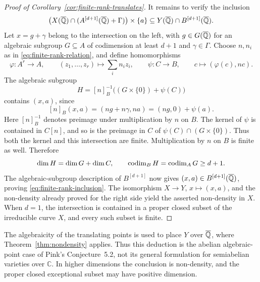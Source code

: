 \begin{proof}[Proof of Corollary~\ref{cor:finite-rank-translates}]
It remains to verify the inclusion
\begin{equation}\label{eq:finite-rank-inclusion}
 \bigl(X(\overline{\mathbb Q})\cap(A^{[d+1]}(\overline{\mathbb Q})+\Gamma)\bigr)\times\{a\}
 \subseteq Y(\overline{\mathbb Q})\cap B^{[d+1]}(\overline{\mathbb Q}).
\end{equation}
Let $x=g+\gamma$ belong to the intersection on the left, with
$g\in G(\overline{\mathbb Q})$ for an algebraic subgroup $G\subseteq A$ of codimension
at least $d+1$ and $\gamma\in\Gamma$. Choose $n,n_i$ as in
\eqref{eq:finite-rank-relation}, and define homomorphisms
\[
 \varphi:A^r\longrightarrow A,\qquad
 (z_1,\ldots,z_r)\longmapsto\sum_i n_i z_i,
 \qquad
 \psi:C\longrightarrow B,\qquad
 c\longmapsto(\varphi(c),nc).
\]
The algebraic subgroup
\[
 H=[n]_B^{-1}\bigl((G\times\{0\})+\psi(C)\bigr)
\]
contains $(x,a)$, since
\[
 [n]_B(x,a)=(ng+n\gamma,na)=(ng,0)+\psi(a).
\]
Here $[n]_B^{-1}$ denotes preimage under multiplication by $n$ on $B$.
The kernel of $\psi$ is contained in $C[n]$, and so is the preimage in
$C$ of $\psi(C)\cap(G\times\{0\})$. Thus both the kernel and this
intersection are finite. Multiplication by $n$ on $B$ is finite as well.
Therefore
\[
 \dim H=\dim G+\dim C,
 \qquad
 \operatorname{codim}_B H=\operatorname{codim}_A G\ge d+1.
\]
The algebraic-subgroup description of $B^{[d+1]}$ now gives
$(x,a)\in B^{[d+1]}(\overline{\mathbb Q})$, proving
\eqref{eq:finite-rank-inclusion}. The isomorphism $X\longrightarrow Y$,
$x\longmapsto(x,a)$, and the non-density already proved for the right
side yield the asserted non-density in $X$. When $d=1$, the intersection
is contained in a proper closed subset of the irreducible curve $X$,
and every such subset is finite.
\end{proof}

The algebraicity of the translating points is used to place $Y$ over
$\overline{\mathbb Q}$, where Theorem~\ref{thm:nondensity} applies. Thus this deduction
is the abelian algebraic-point case of Pink's Conjecture~5.2, not its
general formulation for semiabelian varieties over $\mathbb C$. In
higher dimensions the conclusion is non-density, and the proper closed
exceptional subset may have positive dimension.
